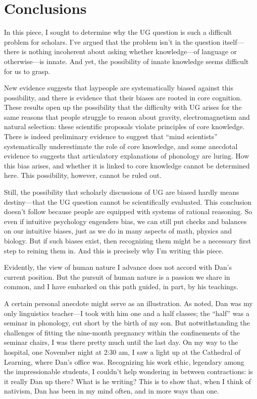 \documentclass[output=paper,colorlinks,citecolor=brown
]{langscibook}
\begin{document}
\section{Conclusions}
In this piece, I sought to determine why the UG question is such a difficult problem for scholars. I’ve argued that the problem isn’t in the question itself—there is nothing incoherent about asking whether knowledge—of language or otherwise—is innate. And yet, the possibility of innate knowledge seems difficult for us to grasp. 

New evidence suggests that laypeople are systematically biased against this possibility, and there is evidence that their biases are rooted in core cognition. These results open up the possibility that the difficulty with UG arises for the same reasons that people struggle to reason about gravity, electromagnetism and natural selection: these scientific proposals violate principles of core knowledge. There is indeed preliminary evidence to suggest that “mind scientists” systematically underestimate the role of core knowledge, and some anecdotal evidence to suggests that articulatory explanations of phonology are luring. How this bias arises, and whether it is linked to core knowledge cannot be determined here. This possibility, however, cannot be ruled out.

Still, the possibility that scholarly discussions of UG are biased hardly means destiny—that the UG question cannot be scientifically evaluated. This conclusion doesn’t follow because people are equipped with systems of rational reasoning. So even if intuitive psychology engenders bias, we can still put checks and balances on our intuitive biases, just as we do in many aspects of math, physics and biology. But if such biases exist, then recognizing them might be a necessary first step to reining them in. And this is precisely why I’m writing this piece.

Evidently, the view of human nature I advance does not accord with Dan’s current position. But the pursuit of human nature is a passion we share in common, and I have embarked on this path guided, in part, by his teachings. 

A certain personal anecdote might serve as an illustration. As noted, Dan was my only linguistics teacher—I took with him one and a half classes; the “half” was a seminar in phonology, cut short by the birth of my son. But notwithstanding the challenges of fitting the nine-month pregnancy within the confinements of the seminar chairs, I was there pretty much until the last day. On my way to the hospital, one November night at 2:30 am, I saw a light up at the Cathedral of Learning, where Dan’s office was. Recognizing his work ethic, legendary among the impressionable students, I couldn’t help wondering in between contractions: is it really Dan up there? What is he writing? This is to show that, when I think of nativism, Dan has been in my mind often, and in more ways than one. 

\printbibliography[heading=subbibliography,notkeyword=this]

\sloppy
\end{document}
